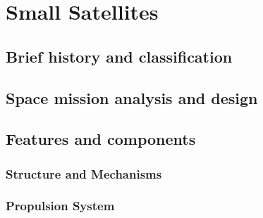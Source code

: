 %
%
%


\chapter{Small Satellites}
\label{chp:SmallSat}

\section{Brief history and classification}
\label{sec:SmallSat_HistoryClass}

{\small\textit{\lipsum[1-2]}}

\section{Space mission analysis and design}
\label{sec:SmallSat_Analysis_Design}

{\small\textit{\lipsum[1-2]}}

\section{Features and components}
\label{sec:SmallSat_FeaturesComponents}

{\small\textit{\lipsum[1-2]}}

\subsection{Structure and Mechanisms}
\label{subsec:Structures}

{\small\textit{\lipsum[1-2]}}

\subsection{Propulsion System}
\label{subsec:Propulsion}

